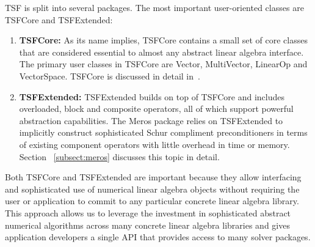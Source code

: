 \documentclass[acmtoms,acmnow]{acmtrans2m}
\begin{document}
TSF is split into several packages.  The most important user-oriented
classes are TSFCore and TSFExtended:
\begin{enumerate}
\item {\bf TSFCore:} As its name implies, TSFCore contains a small set
of core classes that are considered essential to almost any abstract
linear algebra interface.  The primary user classes in TSFCore are
Vector, MultiVector, LinearOp and VectorSpace. TSFCore is discussed in
detail in~\cite{TSFCore}.
\item {\bf TSFExtended:} TSFExtended builds on top of TSFCore and
includes overloaded, block and composite operators, all of
which support powerful abstraction capabilities.  The Meros package
relies on TSFExtended to implicitly construct sophisticated
Schur compliment preconditioners in terms of existing component
operators with little overhead in time or memory.  Section
~\ref{subsect:meros} discusses this topic in detail.
\end{enumerate}

Both TSFCore and TSFExtended are important because they allow
interfacing and sophisticated use of numerical linear algebra objects
without requiring the user or application to commit to any particular
concrete linear algebra library.  This approach allows us to leverage
the investment in sophisticated abstract numerical algorithms across
many concrete linear algebra libraries and gives application
developers a single API that provides access to many solver packages.


%
%
%
%
\end{document}

